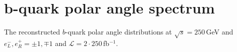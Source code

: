 

\section*{$\pmb{b}$-quark polar angle spectrum}

The reconstructed $b$-quark polar angle distributions at $\sqrt{s} = 250$\,GeV and $e^-_L, e^+_R = \pm1, \mp1$ and $\mathcal{L} = 2\cdot 250 $\,fb$^{-1}$.
